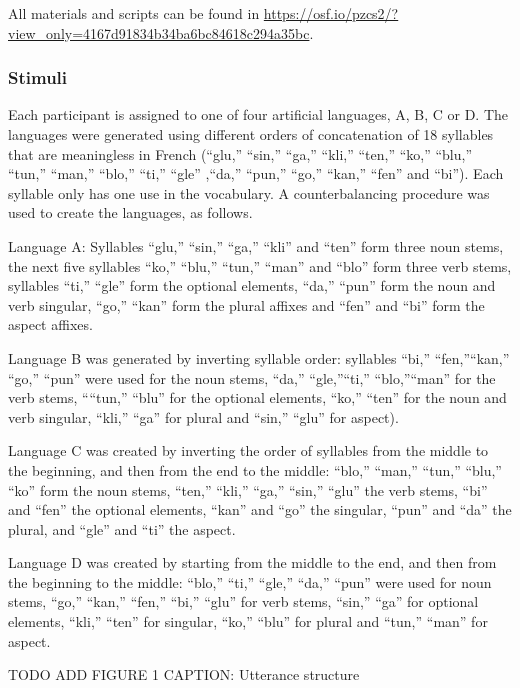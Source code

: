 \documentclass[
  american,
  ,man,floatsintext]{apa6}
\begin{document}
All materials and scripts can be found in \url{https://osf.io/pzcs2/?view_only=4167d91834b34ba6bc84618c294a35bc}.

\hypertarget{stimuli}{%
\subsubsection{Stimuli}\label{stimuli}}

Each participant is assigned to one of four artificial languages, A, B, C or D. The languages were generated using different orders of concatenation of 18 syllables that are meaningless in French (``glu,'' ``sin,'' ``ga,'' ``kli,'' ``ten,'' ``ko,'' ``blu,'' ``tun,'' ``man,'' ``blo,'' ``ti,'' ``gle'' ,``da,'' ``pun,'' ``go,'' ``kan,'' ``fen'' and ``bi''). Each syllable only has one use in the vocabulary. A counterbalancing procedure was used to create the languages, as follows.

Language A: Syllables ``glu,'' ``sin,'' ``ga,'' ``kli'' and ``ten'' form three noun stems, the next five syllables ``ko,'' ``blu,'' ``tun,'' ``man'' and ``blo'' form three verb stems, syllables ``ti,'' ``gle'' form the optional elements, ``da,'' ``pun'' form the noun and verb singular, ``go,'' ``kan'' form the plural affixes and ``fen'' and ``bi'' form the aspect affixes.

Language B was generated by inverting syllable order: syllables ``bi,'' ``fen,''``kan,'' ``go,'' ``pun'' were used for the noun stems, ``da,'' ``gle,''``ti,'' ``blo,''``man'' for the verb stems, ````tun,'' ``blu'' for the optional elements, ``ko,'' ``ten'' for the noun and verb singular, ``kli,'' ``ga'' for plural and ``sin,'' ``glu'' for aspect).

Language C was created by inverting the order of syllables from the middle to the beginning, and then from the end to the middle: ``blo,'' ``man,'' ``tun,'' ``blu,'' ``ko'' form the noun stems, ``ten,'' ``kli,'' ``ga,'' ``sin,'' ``glu'' the verb stems, ``bi'' and ``fen'' the optional elements, ``kan'' and ``go'' the singular, ``pun'' and ``da'' the plural, and ``gle'' and ``ti'' the aspect.

Language D was created by starting from the middle to the end, and then from the beginning to the middle: ``blo,'' ``ti,'' ``gle,'' ``da,'' ``pun'' were used for noun stems, ``go,'' ``kan,'' ``fen,'' ``bi,'' ``glu'' for verb stems, ``sin,'' ``ga'' for optional elements, ``kli,'' ``ten'' for singular, ``ko,'' ``blu'' for plural and ``tun,'' ``man'' for aspect.

TODO ADD FIGURE 1
CAPTION: Utterance structure
\end{document}
